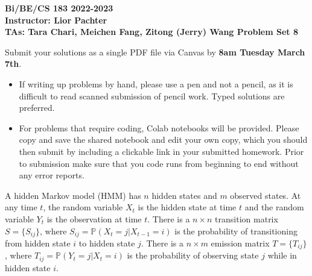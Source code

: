 \documentclass[11pt]{exam}
\begin{document}
\begin{center}

     \textbf{Bi/BE/CS 183 2022-2023\\ Instructor: Lior Pachter\\ TAs: Tara Chari, Meichen Fang, Zitong (Jerry) Wang \vskip 0.15in Problem Set 8}

\end{center}
Submit your solutions as a single PDF file via Canvas by {\bf 8am Tuesday March 7th}. 
\begin{itemize}
  \item If writing up problems by hand, please use a pen and not a pencil, as it is difficult to read scanned submission of pencil work. Typed solutions are preferred.
  \item For problems that require coding, Colab notebooks will be provided. Please copy and save the shared notebook and edit your own copy, which you should then submit by including a clickable link in your submitted homework. Prior to submission make sure that you code runs from beginning to end without any error reports.
  \end{itemize}
  
  
  A hidden Markov model (HMM) has $n$ hidden states and $m$ observed states. At any time $t$, the random variable $X_t$ is the hidden state at time $t$ and the random variable $Y_t$ is the observation at time $t$. There is a $n\times n$ transition matrix $S = \{S_{ij}\}$, where $S_{ij} = \mathbb{P}(X_t = j | X_{t-1} = i)$ is the probability of transitioning from hidden state $i$ to hidden state $j$. There is a $n \times m$ emission matrix $T = \{T_{ij}\}$, where $T_{ij} = \mathbb{P}(Y_t = j | X_t = i)$ is the probability of observing state $j$ while in hidden state $i$.
  
\end{document}
